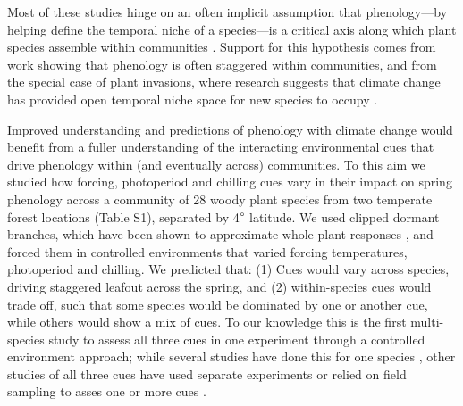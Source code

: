 \documentclass[11pt]{article}
\begin{document}
Most of these studies hinge on an often implicit assumption that phenology---by helping define the temporal niche of a species---is a critical axis along which plant species assemble within communities \citep{gotelli1996,Loreau:2008xy}. Support for this hypothesis comes from work showing that phenology is often staggered within communities, and from the special case of plant invasions, where research suggests that climate change has provided open temporal niche space for new species to occupy \citep{Willis:2010al,wolkovichAmBot2013}.  

Improved understanding and predictions of phenology with climate change would benefit from a fuller understanding of the interacting environmental cues that drive phenology within (and eventually across) communities. To this aim we studied how forcing, photoperiod and chilling cues vary in their impact on spring phenology across a community of 28 woody plant species from two temperate forest locations (Table S1), separated by 4$\degree$ latitude. We used clipped dormant branches, which have been shown to approximate whole plant responses \citep{vitasseclippings}, and forced them in controlled environments that varied forcing temperatures, photoperiod and chilling. We predicted that: (1) Cues would vary across species, driving staggered leafout across the spring, and (2) within-species cues would trade off, such that some species would be dominated by one or another cue, while others would show a mix of cues. To our knowledge this is the first multi-species study to assess all three cues in one experiment through a controlled environment approach; while several studies have done this for one species \citep{Worrall:1967aa,Skuterud:1994aa,Sogaard:2008aa,Sonsteby:2014aa}, other studies of all three cues have used separate experiments \citep[e.g.,][]{Caffarra:2011ab} or relied on field sampling to asses one or more cues \citep[e.g,][]{Basler:2012aa,laube2014gcb,zohner2016ncc}. 
\end{document}
